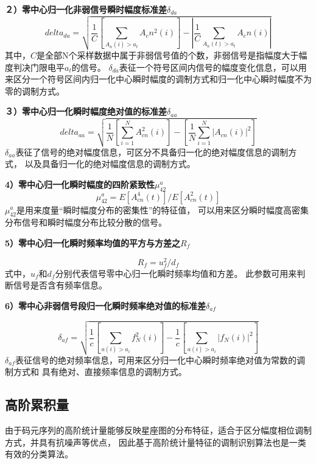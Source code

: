 \textbf{２）零中心归一化非弱信号瞬时幅度标准差$\delta_{da}$}
\begin{equation}
delta_{da}=\sqrt{\frac{1}{C}\left[\sum_{A_n(i)>a_t} A_cn^2(i)\right]
	- \left|\frac{1}{C} \sum_{A_n(t)>a_t} A_cn(i)\right|}
\end{equation}
其中，$C$是全部N个采样数据中属于非弱信号值的个数，非弱信号是指幅度大于幅度判决门限电平$a_t$的信号。
$\delta_{da}$表征一个符号区间内信号的幅度变化信息，可以用来区分一个符号区间内归一化中心瞬时幅度的调制方式和归一化中心瞬时幅度不为零的调制方式。


\textbf{３）零中心归一化瞬时幅度绝对值的标准差$\delta_{aa}$}
\begin{equation}
delta_{aa} = \sqrt{\frac{1}{N}\left[\sum_{i=1}^{N} A_{cn}^2(i)\right]
	- \left[\frac{1}{N} \sum_{i=1}^{N} \left|A_{cn}(i)\right|^2\right]}
\end{equation}
$\delta_{aa}$表征了信号的绝对幅度信息，可区分不具备归一化的绝对幅度信息的调制方式，
以及具备归一化的绝对幅度信息的调制方式。


\textbf{4）零中心归一化瞬时幅度的四阶紧致性$\mu_{42}^{a}$}
\begin{equation}
\mu_{42}^{a} = E\left[A_{cn}^{4} (t) \right] / E\left[A_{cn}^{2} (t) \right]
\end{equation}
$\mu_{42}^{a}$是用来度量“瞬时幅度分布的密集性”的特征值，
可以用来区分瞬时幅度高密集分布信号和瞬时幅度分布比较分散的信号。


\textbf{5）零中心归一化瞬时频率均值的平方与方差之$R_f$}\par
\begin{equation}
R_f = u_f^2 / d_f
\end{equation}
式中，$u_f$和$d_f$分别代表信号零中心归一化瞬时频率均值和方差。
此参数可用来判断信号是否含有频率信息。


\textbf{6）零中心非弱信号段归一化瞬时频率绝对值的标准差$\delta_{af}$}

\begin{equation}
\delta_{af} = \sqrt{\frac{1}{c}\left[\sum_{a(i)>a_i} f_N^2(i)\right]
	- \frac{1}{c}\left[\sum_{a(i)>a_i} \left|f_N(i)\right|^2\right]}
\end{equation}
$\delta_{af}$表征信号的绝对频率信息，可用来区分归一化中心瞬时频率绝对值为常数的调制方式和
具有绝对、直接频率信息的调制方式。

\subsection{高阶累积量}

由于码元序列的高阶统计量能够反映星座图的分布特征，适合于区分幅度相位调制方式，并具有抗噪声等优点，
因此基于高阶统计量特征的调制识别算法也是一类有效的分类算法。\par

